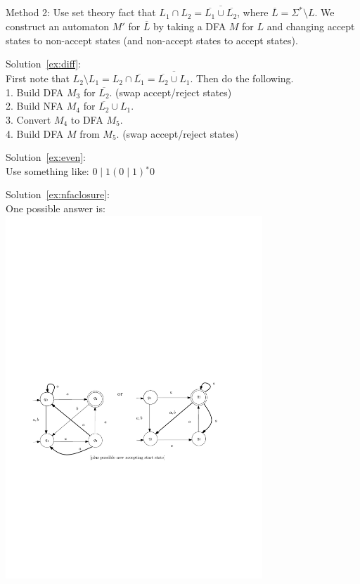 Method 2: Use set theory fact that $L_1 \cap L_2 =
\overline{\overline{L_1} \cup \overline{L_2}}$, where $\overline{L} =
\Sigma^* \setminus L$.  We construct an automaton $M'$ for
$\overline{L}$ by taking a DFA $M$ for $L$ and changing accept
states to non-accept states (and non-accept states to accept states).

\medskip
\noindent Solution~\ref{ex:diff}:\\
First note that $L_2 \setminus L_1 = L_2 \cap \overline{L_1} =
\overline{\overline{L_2} \cup L_1}$.  Then do the following. \\
1. Build DFA $M_3$ for $\overline{L_2}$.  (swap accept/reject states) \\
2. Build NFA $M_4$ for $\overline{L_2} \cup L_1$.  \\
3. Convert $M_4$ to DFA $M_5$.\\
4. Build DFA $M$ from $M_5$. (swap accept/reject states)

\medskip
\noindent Solution~\ref{ex:even}:\\
Use something like: $0\mid1(0\mid1){}^*0$

\medskip
\noindent Solution~\ref{ex:nfaclosure}:\\
One possible answer is:\\
\includegraphics[width=3.8in]{figs/NFAforClosureAns}

